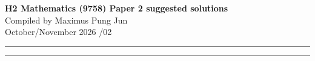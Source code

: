 \documentclass[a4paper,11pt,oneside]{article}
\begin{document}
\thispagestyle{fancy}
\begin{center}
{\LARGE\bfseries H2 Mathematics (9758) Paper 2 suggested solutions}\\[1.2ex]
{\large Compiled by Maximus Pung Jun}\\[0.8ex]
{\normalsize October/November 2026 /02}
\end{center}
\vspace{1.5ex}
\noindent\rule{\textwidth}{0.8pt}\par
\vspace{1.2ex}
\par
\vspace{1.2ex}
\noindent\rule{\textwidth}{0.8pt}\par
\vspace{2ex}
\end{document}
